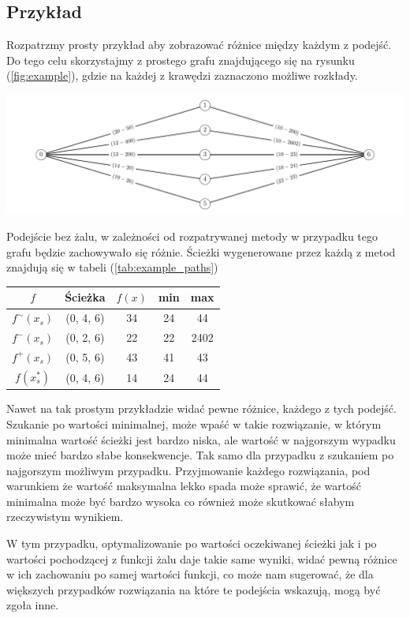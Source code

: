 \documentclass[10pt]{article}
\def\nl{\\\hline}
\def\fsim{f^\sim(x_s)}
\def\fplu{f^+(x_s)}
\def\fmin{f^-(x_s)}
\def\fide{f(x_s^*)}
\begin{document}
\subsection{Przykład}
Rozpatrzmy prosty przykład aby zobrazować różnice między każdym z podejść. Do tego celu skorzystajmy z prostego grafu znajdującego się na rysunku (\ref{fig:example}), gdzie na każdej z krawędzi zaznaczono możliwe rozkłady.
\begin{center}
  \includegraphics[width=\linewidth]{figures/example.pdf}
  \label{fig:example}
\end{center}

Podejście bez żalu, w zależności od rozpatrywanej metody w przypadku tego grafu będzie zachowywało się różnie. Ścieżki wygenerowane przez każdą z metod znajdują się w tabeli (\ref{tab:example_paths})
\begin{center}
  \begin{tabular}{|c|c|c|c|c|}
    \hline
    $f$     & Ścieżka   & $f(x)$ & min & max  \nl
    $\fsim$ & (0, 4, 6) & 34     & 24  & 44   \nl
    $\fmin$ & (0, 2, 6) & 22     & 22  & 2402 \nl
    $\fplu$ & (0, 5, 6) & 43     & 41  & 43   \nl
    $\fide$ & (0, 4, 6) & 14     & 24  & 44   \nl
  \end{tabular}
  \label{tab:example_paths}
\end{center}
Nawet na tak prostym przykładzie widać pewne różnice, każdego z tych podejść. Szukanie po wartości minimalnej, może wpaść w takie rozwiązanie, w którym minimalna wartość ścieżki jest bardzo niska, ale wartość w najgorszym wypadku może mieć bardzo słabe konsekwencje. Tak samo dla przypadku z szukaniem po najgorszym możliwym przypadku. Przyjmowanie każdego rozwiązania, pod warunkiem że wartość maksymalna lekko spada może sprawić, że wartość minimalna może być bardzo wysoka co również może skutkować słabym rzeczywistym wynikiem.

W tym przypadku, optymalizowanie po wartości oczekiwanej ścieżki jak i po wartości pochodzącej z funkcji żalu daje takie same wyniki, widać pewną różnice w ich zachowaniu po samej wartości funkcji, co może nam sugerować, że dla większych przypadków rozwiązania na które te podejścia wskazują, mogą być zgoła inne.
\end{document}
